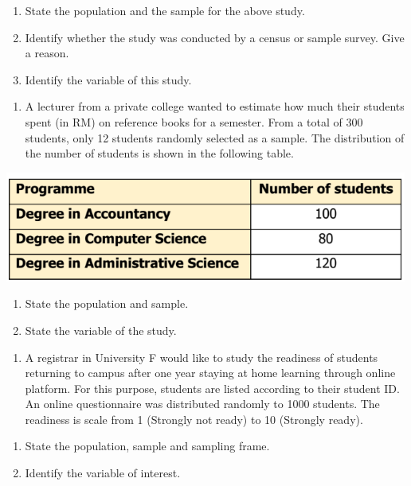 \documentclass[
  a4paper,
  DIV=11,
  numbers=noendperiod,
  oneside]{scrreprt}
\providecommand{\tightlist}{%
  \setlength{\itemsep}{0pt}\setlength{\parskip}{0pt}}\usepackage{longtable,booktabs,array}
\begin{document}
\begin{enumerate}
\def\labelenumi{\alph{enumi})}
\tightlist
\item
  State the population and the sample for the above study.
\item
  Identify whether the study was conducted by a census or sample survey.
  Give a reason.
\item
  Identify the variable of this study.
\end{enumerate}

\begin{enumerate}
\def\labelenumi{\arabic{enumi}.}
\setcounter{enumi}{1}
\tightlist
\item
  A lecturer from a private college wanted to estimate how much their
  students spent (in RM) on reference books for a semester. From a total
  of 300 students, only 12 students randomly selected as a sample. The
  distribution of the number of students is shown in the following
  table.
\end{enumerate}

\includegraphics[width=5.20833in,height=\textheight]{images/ch1/Picture17.png}

\begin{enumerate}
\def\labelenumi{\alph{enumi})}
\tightlist
\item
  State the population and sample.
\item
  State the variable of the study.
\end{enumerate}

\begin{enumerate}
\def\labelenumi{\arabic{enumi}.}
\setcounter{enumi}{2}
\tightlist
\item
  A registrar in University F would like to study the readiness of
  students returning to campus after one year staying at home learning
  through online platform. For this purpose, students are listed
  according to their student ID. An online questionnaire was distributed
  randomly to 1000 students. The readiness is scale from 1 (Strongly not
  ready) to 10 (Strongly ready).
\end{enumerate}

\begin{enumerate}
\def\labelenumi{\alph{enumi})}
\tightlist
\item
  State the population, sample and sampling frame.
\item
  Identify the variable of interest.
\end{enumerate}
\end{document}
